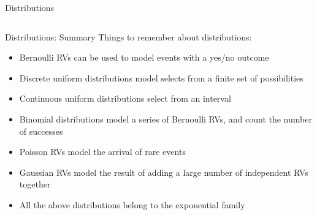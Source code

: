{\begin{frame}{Distributions}
\begin{columns}[onlytextwidth]
\begin{column}{0.45\textwidth}
            \end{column}
        \end{columns}
    \end{frame}


    \begin{frame}{Distributions: Summary}
        Things to remember about distributions:
        \begin{itemize}
            \item Bernoulli RVs can be used to model events with a yes/no outcome
            \item Discrete uniform distributions model selects from a finite set of possibilities
            \item Continuous uniform distributions select from an interval
            \item Binomial distributions model a series of Bernoulli RVs, and count the number of successes
            \item Poisson RVs model the arrival of rare events
            \item Gaussian RVs model the result of adding a large number of independent RVs together
            \item All the above distributions belong to the exponential family
        \end{itemize}
    \end{frame}

}